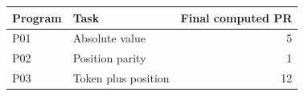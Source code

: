 \begin{center}\small
\begin{tabular}{@{}llr@{}}
\toprule
Program & Task & Final computed PR \\
\midrule
P01 & Absolute value & 5 \\
P02 & Position parity & 1 \\
P03 & Token plus position & 12 \\
\bottomrule
\end{tabular}
\end{center}
